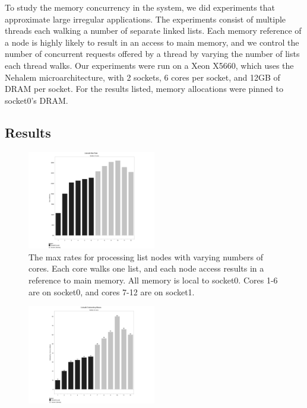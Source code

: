 

To study the memory concurrency in the system, we did experiments that approximate large irregular applications. The experiments consist of multiple threads each walking a number of separate linked lists. Each memory reference of a node is highly likely to result in an access to main memory, and we control the number of concurrent requests offered by a thread by varying the number of lists each thread walks.   Our experiments were run on a Xeon X5660, which uses the Nehalem microarchitecture, with 2 sockets, 6 cores per socket, and 12GB of DRAM per socket. For the results listed, memory allocations were pinned to socket0's DRAM.
\subsection{Results}
 
\begin{figure}
	\begin{center}
 		\includegraphics[width=0.5\textwidth]{figures/multi-listwalk-maxrates.pdf}
	\end{center}
	\caption{The max rates for processing list nodes with varying numbers of cores. Each core walks one list, and each node access results in a reference to main memory. All memory is local to socket0. Cores 1-6 are on socket0, and cores 7-12 are on socket1.}
	\label{fig:listwalk-maxrates}
\end{figure}

\begin{figure}
	\begin{center}
 		\includegraphics[width=0.5\textwidth]{figures/multi-listwalk-outflats.pdf}
	\end{center}
	\caption{}
	\label{fig:listwalk-outflats}
\end{figure}

